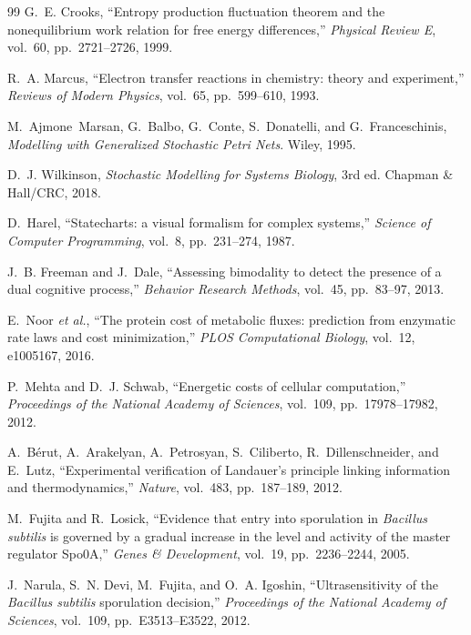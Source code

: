 \documentclass[11pt,a4paper]{article}
\begin{document}
\begin{thebibliography}{99}
G.~E. Crooks,
``Entropy production fluctuation theorem and the nonequilibrium work
relation for free energy differences,''
\textit{Physical Review E}, vol.~60, pp.~2721--2726, 1999.

R.~A. Marcus,
``Electron transfer reactions in chemistry: theory and experiment,''
\textit{Reviews of Modern Physics}, vol.~65, pp.~599--610, 1993.

M.~Ajmone~Marsan, G.~Balbo, G.~Conte, S.~Donatelli, and G.~Franceschinis,
\textit{Modelling with Generalized Stochastic Petri Nets}.
Wiley, 1995.

D.~J. Wilkinson,
\textit{Stochastic Modelling for Systems Biology},
3rd ed.
Chapman \& Hall/CRC, 2018.

D.~Harel,
``Statecharts: a visual formalism for complex systems,''
\textit{Science of Computer Programming}, vol.~8, pp.~231--274, 1987.

J.~B. Freeman and J.~Dale,
``Assessing bimodality to detect the presence of a dual cognitive
process,''
\textit{Behavior Research Methods}, vol.~45, pp.~83--97, 2013.

E.~Noor \textit{et al.},
``The protein cost of metabolic fluxes: prediction from enzymatic rate
laws and cost minimization,''
\textit{PLOS Computational Biology}, vol.~12, e1005167, 2016.

P.~Mehta and D.~J. Schwab,
``Energetic costs of cellular computation,''
\textit{Proceedings of the National Academy of Sciences}, vol.~109,
pp.~17978--17982, 2012.

A.~B\'erut, A.~Arakelyan, A.~Petrosyan, S.~Ciliberto, R.~Dillenschneider,
and E.~Lutz,
``Experimental verification of Landauer's principle linking information
and thermodynamics,''
\textit{Nature}, vol.~483, pp.~187--189, 2012.

M.~Fujita and R.~Losick,
``Evidence that entry into sporulation in \textit{Bacillus subtilis} is
governed by a gradual increase in the level and activity of the master
regulator {Spo0A},''
\textit{Genes \& Development}, vol.~19, pp.~2236--2244, 2005.

J.~Narula, S.~N. Devi, M.~Fujita, and O.~A. Igoshin,
``Ultrasensitivity of the \textit{Bacillus subtilis} sporulation
decision,''
\textit{Proceedings of the National Academy of Sciences}, vol.~109,
pp.~E3513--E3522, 2012.


\end{thebibliography}
\end{document}
